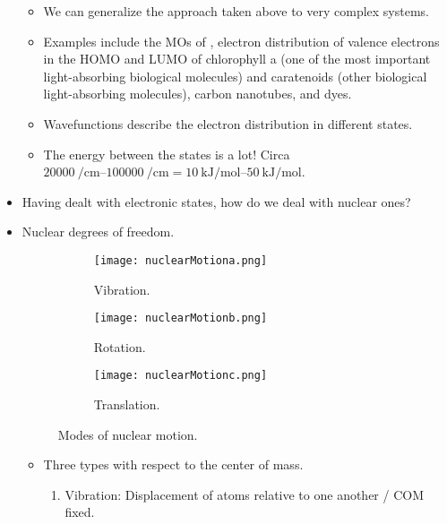 \documentclass[../notes.tex]{subfiles}
\begin{document}
\begin{itemize}
    \begin{itemize}
        \item We can generalize the approach taken above to very complex systems.
        \item Examples include the MOs of , electron distribution of valence electrons in the HOMO and LUMO of chlorophyll a (one of the most important light-absorbing biological molecules) and caratenoids (other biological light-absorbing molecules), carbon nanotubes, and dyes.
        \item Wavefunctions describe the electron distribution in different states.
        \item The energy between the states is a lot! Circa $\SIrange{20000}{100000}{\per\centi\meter}=\SIrange[per-mode=symbol]{10}{50}{\kilo\joule\per\mole}$.
    \end{itemize}
    \item Having dealt with electronic states, how do we deal with nuclear ones?
    \item Nuclear degrees of freedom.
    \begin{figure}[H]
        \centering
        \begin{subfigure}[b]{0.3\linewidth}
            \centering
            \texttt{[image: nuclearMotiona.png]}
            \caption{Vibration.}
            \label{fig:nuclearMotiona}
        \end{subfigure}
        \begin{subfigure}[b]{0.3\linewidth}
            \centering
            \texttt{[image: nuclearMotionb.png]}
            \caption{Rotation.}
            \label{fig:nuclearMotionb}
        \end{subfigure}
        \begin{subfigure}[b]{0.3\linewidth}
            \centering
            \texttt{[image: nuclearMotionc.png]}
            \caption{Translation.}
            \label{fig:nuclearMotionc}
        \end{subfigure}
        \caption{Modes of nuclear motion.}
        \label{fig:nuclearMotion}
    \end{figure}
    \begin{itemize}
        \item Three types with respect to the center of mass.
        \begin{enumerate}
            \item Vibration: Displacement of atoms relative to one another / COM fixed.

\end{enumerate}
\end{itemize}
\end{itemize}
\end{document}
